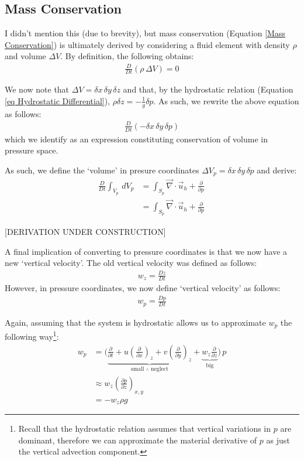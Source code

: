 \subsection{Mass Conservation}

I didn't mention this (due to brevity), but mass conservation (Equation \ref{Mass Conservation}) is ultimately derived by considering a fluid element with density \(\rho\) and volume \(\Delta V\). By definition, the following obtains:
\begin{align*}
    \frac{D}{Dt}\left( \rho\, \Delta V \right)=0
\end{align*}

We now note that \(\Delta V = \delta x\,\delta y\, \delta z\) and that, by the hydrostatic relation (Equation \ref{eq Hydrostatic Differential}), \(\rho\delta z = -\frac{1}{g}\delta p\). As such, we rewrite the above equation as follows:
\begin{align*}
    \frac{D}{Dt}\left( 
        -\delta x\,\delta y\, \delta p
     \right)
\end{align*}
which we identify as an expression constituting conservation of volume in pressure space.

As such, we define the `volume' in presure coordinates \(\Delta V_p = \delta x\,\delta y\, \delta p\) and derive:
\begin{align*}
    \frac{D}{Dt}\int_{V_p}\,dV_p
    &
    =
    \int_{S_p}\vec{\nabla}\cdot\vec{u}_h + \frac{\partial }{\partial p}
    \\
    &
    =
    \int_{S_p}\vec{\nabla}\cdot\vec{u}_h + \frac{\partial }{\partial p}
    \,
\end{align*}


[DERIVATION UNDER CONSTRUCTION]

A final implication of converting to pressure coordinates is that we now have a new `vertical velocity'. The old vertical velocity was defined as follows:
\begin{align*}
    w_z = \frac{D z}{Dt}
\end{align*}
However, in pressure coordinates, we now define `vertical velocity' as follows:
\begin{align*}
    w_p = \frac{D p}{Dt}
\end{align*}

Again, assuming that the system is hydrostatic allows us to approximate \(w_p\) the following way\footnote{
    Recall that the hydrostatic relation assumes that vertical variations in \(p\) are dominant, therefore we can approximate the material derivative of \(p\) as just the vertical advection component.
}:
\begin{align*}
    w_p &= \biggl( \underbrace{\frac{\partial }{\partial t} + u\left( \frac{\partial}{\partial x} \right)_{z}+v\left( \frac{\partial}{\partial y} \right)_{z}}_{\text{small }\therefore \text{ neglect}}+\underbrace{w_z \frac{\partial}{\partial z}}_{\text{big}} \biggr)\, p
    \\
    &\approx w_z \left( \frac{\partial p}{\partial z} \right)_{x,y}
    \\
    & = -w_z\rho g
\end{align*}

